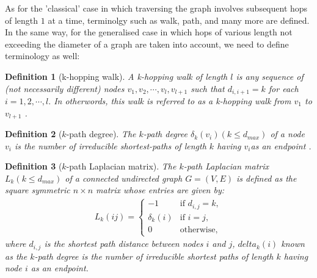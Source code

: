 \documentclass[10pt,a4paper]{article}
\newtheorem{defn}{Definition}
\begin{document}
    	    As for the 'classical' case in which traversing the graph involves subsequent hops of length $1$ at a time, terminolgy such as walk, path, and many more are defined. In the same way, for the generalised case in which hops of various length not exceeding the diameter of a graph are taken into account,  we need to define terminology as well:\\
    	    \begin{defn}[k-hopping walk]
    	    	A k-hopping walk of length $l$ is any sequence of (not necessarily different) nodes $v_1,v_2, \cdots,v_l, v_{l+1}$ such that $d_{i,i+1} = k$ for each $i=1,2, \cdots, l.$ In otherwords, this walk is referred to as a k-hopping walk from $v_1$ to $v_{l+1}$ \citep{estrada2012path}.\\ 
    	    \end{defn}
    	    
    	    
    	    \begin{defn}[$k$-path degree]
    	    	The $k$-path degree $\delta_k(v_i)(k\leq d_{max})$ of a node $v_i$ is the number of irreducible shortest-paths of length $k$ having $v_i$as an endpoint \citep{estrada2012path}. \\
    	    \end{defn}
    	    \begin{defn}[$k$-path Laplacian matrix]
    	    	The $k$-path Laplacian matrix $L_k(k \leq d_{max})$ of a connected undirected graph $G=(V,E)$ is defined as the square symmetric $n \times n$ matrix whose entries are given by:
    	    	\begin{eqnarray}
    	    	L_k(ij) = \begin{cases} -1 &\mbox{if } d_{i,j} = k, \\
    	    	\delta_k(i) &\mbox{if } i = j,  \\
    	    	0 & \text{otherwise},
    	    	\end{cases}
    	    	\end{eqnarray}\label{k-laplacian}
    	    	where $d_{i,j}$ is the shortest path distance between nodes $i$ and $j$, $delta_{k}(i)$ known as the $k$-path degree is the number of irreducible shortest paths of length $k$ having node $i$ as an endpoint.\\
    	    \end{defn}
    	    
\end{document}
